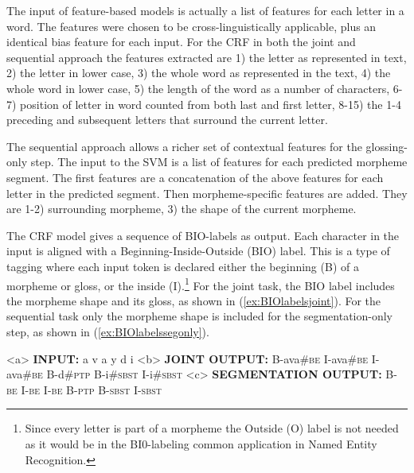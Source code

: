 The input of feature-based models is actually a list of features for each letter in a word. The features were chosen to be cross-linguistically applicable, plus an identical bias feature for each input. For the CRF in both the joint and sequential approach the features extracted are 1) the letter as represented in text, 2) the letter in lower case, 3) the whole word as represented in the text, 4) the whole word in lower case, 5) the length of the word as a number of characters, 6-7) position of letter in word counted from both last and first letter, 8-15) the 1-4 preceding and subsequent letters that surround the current letter. 

The sequential approach allows a richer set of contextual features for the glossing-only step. The input to the SVM is a list of features for each predicted morpheme segment. The first features are a concatenation of the above features for each letter in the predicted segment. Then morpheme-specific features are added. They are 1-2) surrounding morpheme, 3) the shape of the current morpheme. 

The CRF model gives a sequence of BIO-labels \citep{ramshaw1999} as output. Each character in the input is aligned with a Beginning-Inside-Outside (BIO) label. This is a type of tagging where each input token is declared either the beginning (B) of a morpheme or gloss, or the inside (I).\footnote{Since every letter is part of a morpheme the Outside (O) label is not needed as it would be in the BI0-labeling common application in Named Entity Recognition.} For the joint task, the BIO label includes the morpheme shape and its gloss, as shown in (\ref{ex:BIOlabelsjoint}). For the sequential task only the morpheme shape is included for the segmentation-only step, as shown in (\ref{ex:BIOlabelssegonly}). 

\pex   
\label{ex:BIOlabels}
\a<a> {\bf INPUT:} \hspace{3 mm}  a \hspace{2 mm}  v \hspace{2 mm} a \hspace{2 mm} y \hspace{2 mm} d \hspace{2 mm} i
\a<b> {\bf JOINT OUTPUT:} \hspace{.5 mm} B-ava\#\textsc{be} \hspace{.5 mm} I-ava\#\textsc{be}  \hspace{.5 mm} I-ava\#\textsc{be} \hspace{1 mm} B-d\#\textsc{ptp}  \hspace{.5 mm}B-i\#\textsc{sbst}  \hspace{.5 mm} I-i\#\textsc{sbst}
\label{ex:BIOlabelsjoint}
\a<c> {\bf SEGMENTATION OUTPUT:} \hspace{1 mm} B-\textsc{be} \hspace{1 mm} I-\textsc{be} \hspace{1 mm} I-\textsc{be} \hspace{1 mm} B-\textsc{ptp} \hspace{1 mm} B-\textsc{sbst} \hspace{1 mm} I-\textsc{sbst}
\label{ex:BIOlabelssegonly}
\xe

